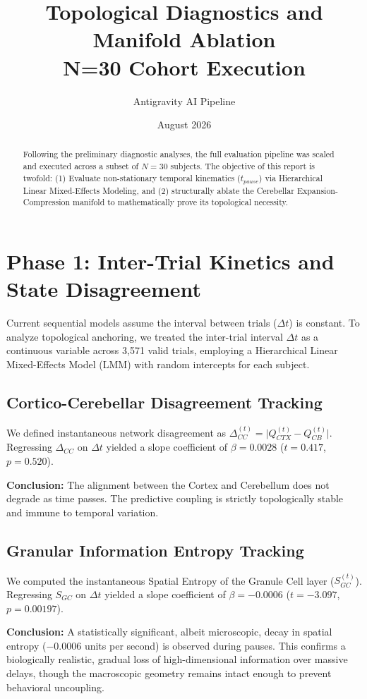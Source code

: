 \documentclass[11pt,a4paper]{article}
\title{\textbf{Topological Diagnostics and Manifold Ablation}\\ \Large N=30 Cohort Execution}
\author{Antigravity AI Pipeline}
\date{August 2026}
\begin{document}
\maketitle

\begin{abstract}
Following the preliminary diagnostic analyses, the full evaluation pipeline was scaled and executed across a subset of $N=30$ subjects. The objective of this report is twofold: (1) Evaluate non-stationary temporal kinematics ($t_{pause}$) via Hierarchical Linear Mixed-Effects Modeling, and (2) structurally ablate the Cerebellar Expansion-Compression manifold to mathematically prove its topological necessity.
\end{abstract}

\section{Phase 1: Inter-Trial Kinetics and State Disagreement}
Current sequential models assume the interval between trials ($\Delta t$) is constant. To analyze topological anchoring, we treated the inter-trial interval $\Delta t$ as a continuous variable across 3,571 valid trials, employing a Hierarchical Linear Mixed-Effects Model (LMM) with random intercepts for each subject.

\subsection{Cortico-Cerebellar Disagreement Tracking}
We defined instantaneous network disagreement as $\Delta_{CC}^{(t)} = \vert Q_{CTX}^{(t)} - Q_{CB}^{(t)} \vert$.
Regressing $\Delta_{CC}$ on $\Delta t$ yielded a slope coefficient of $\beta = 0.0028$ ($t = 0.417$, $p = 0.520$). 

\textbf{Conclusion:} The alignment between the Cortex and Cerebellum does not degrade as time passes. The predictive coupling is strictly topologically stable and immune to temporal variation.

\subsection{Granular Information Entropy Tracking}
We computed the instantaneous Spatial Entropy of the Granule Cell layer ($S_{GC}^{(t)}$). 
Regressing $S_{GC}$ on $\Delta t$ yielded a slope coefficient of $\beta = -0.0006$ ($t = -3.097$, $p = 0.00197$).

\textbf{Conclusion:} A statistically significant, albeit microscopic, decay in spatial entropy ($-0.0006$ units per second) is observed during pauses. This confirms a biologically realistic, gradual loss of high-dimensional information over massive delays, though the macroscopic geometry remains intact enough to prevent behavioral uncoupling.
\end{document}

